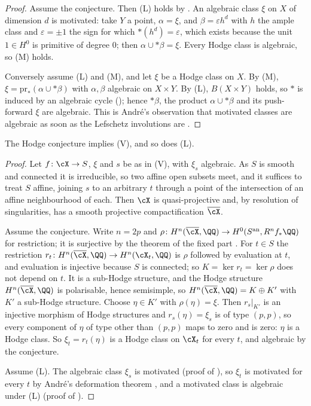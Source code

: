\begin{proof}
Assume the conjecture. Then \textup{(L)} holds by \cite[Theorem~12.2]{paperI}. An
algebraic class $\xi$ on $X$ of dimension $d$ is motivated: take $Y$ a point,
$\alpha=\xi$, and $\beta=\varepsilon h^{d}$ with $h$ the ample class and
$\varepsilon=\pm1$ the sign for which ${*}(h^{d})=\varepsilon$, which exists
because the unit $1\in H^{0}$ is primitive of degree $0$; then
$\alpha\cup{*}\beta=\xi$. Every Hodge class is algebraic, so \textup{(M)}
holds.

Conversely assume \textup{(L)} and \textup{(M)}, and let $\xi$ be a Hodge
class on $X$. By \textup{(M)}, $\xi=\mathrm{pr}_{*}(\alpha\cup{*}\beta)$ with
$\alpha,\beta$ algebraic on $X\times Y$. By \textup{(L)}, $B(X\times Y)$
holds, so ${*}$ is induced by an algebraic cycle
(); hence ${*}\beta$, the product
$\alpha\cup{*}\beta$ and its push-forward $\xi$ are algebraic. This is
Andr\'e's observation that motivated classes are algebraic as soon as the
Lefschetz involutions are \cite[\S2.1]{And96b}.
\end{proof}

\begin{proposition}\label{prop:lefvhc}
The Hodge conjecture implies \textup{(V)}, and so does \textup{(L)}.
\end{proposition}

\begin{proof}
Let $f\colon\cX\to S$, $\xi$ and $s$ be as in \textup{(V)}, with $\xi_{s}$
algebraic. As $S$ is smooth and connected it is irreducible, so two affine
open subsets meet, and it suffices to treat $S$ affine, joining $s$ to an
arbitrary $t$ through a point of the intersection of an affine neighbourhood
of each. Then $\cX$ is quasi-projective and, by resolution of singularities,
has a smooth projective compactification $\overline{\cX}$.

Assume the conjecture. Write $n=2p$ and
$\rho\colon H^{n}(\overline{\cX},\QQ)\to H^{0}(S^{\mathrm{an}},R^{n}f_{*}\QQ)$
for restriction; it is surjective by the theorem of the fixed part
\cite[4.1.1(ii)]{Del71}. For $t\in S$ the restriction
$r_{t}\colon H^{n}(\overline{\cX},\QQ)\to H^{n}(\cX_{t},\QQ)$ is $\rho$
followed by evaluation at $t$, and evaluation is injective because $S$ is
connected; so $K=\ker r_{t}=\ker\rho$ does not depend on $t$. It is a
sub-Hodge structure, and the Hodge structure $H^{n}(\overline{\cX},\QQ)$ is
polarisable, hence semisimple, so $H^{n}(\overline{\cX},\QQ)=K\oplus K'$
with $K'$ a sub-Hodge structure. Choose $\eta\in K'$ with $\rho(\eta)=\xi$.
Then $r_{s}|_{K'}$ is an injective morphism of Hodge structures and
$r_{s}(\eta)=\xi_{s}$ is of type $(p,p)$, so every component of $\eta$ of
type other than $(p,p)$ maps to zero and is zero: $\eta$ is a Hodge class.
So $\xi_{t}=r_{t}(\eta)$ is a Hodge class on $\cX_{t}$ for every $t$, and
algebraic by the conjecture.

Assume \textup{(L)}. The algebraic class $\xi_{s}$ is motivated (proof of
), so $\xi_{t}$ is motivated for every $t$ by Andr\'e's
deformation theorem \cite[Th\'eor\`eme~0.5]{And96b}, and a motivated class is
algebraic under \textup{(L)} (proof of ).
\end{proof}

